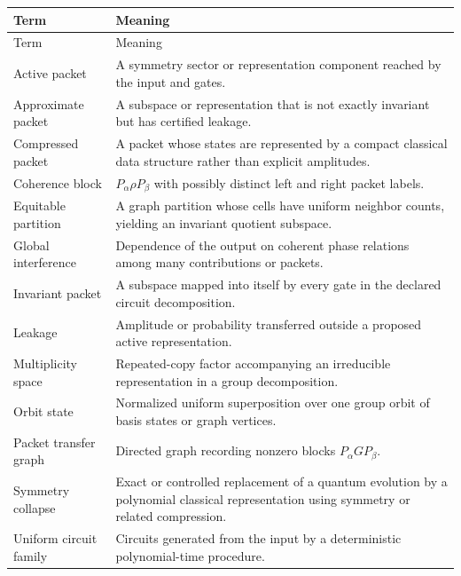 \begingroup\small

\begin{longtable}{@{}L{.25\textwidth}L{.66\textwidth}@{}}
\toprule
Term & Meaning\\
\midrule
\endfirsthead
\toprule
Term & Meaning\\
\midrule
\endhead
Active packet & A symmetry sector or representation component reached by the input and gates.\\
Approximate packet & A subspace or representation that is not exactly invariant but has certified leakage.\\
Compressed packet & A packet whose states are represented by a compact classical data structure rather than explicit amplitudes.\\
Coherence block & $P_\alpha\rho P_\beta$ with possibly distinct left and right packet labels.\\
Equitable partition & A graph partition whose cells have uniform neighbor counts, yielding an invariant quotient subspace.\\
Global interference & Dependence of the output on coherent phase relations among many contributions or packets.\\
Invariant packet & A subspace mapped into itself by every gate in the declared circuit decomposition.\\
Leakage & Amplitude or probability transferred outside a proposed active representation.\\
Multiplicity space & Repeated-copy factor accompanying an irreducible representation in a group decomposition.\\
Orbit state & Normalized uniform superposition over one group orbit of basis states or graph vertices.\\
Packet transfer graph & Directed graph recording nonzero blocks $P_\alpha G P_\beta$.\\
Symmetry collapse & Exact or controlled replacement of a quantum evolution by a polynomial classical representation using symmetry or related compression.\\
Uniform circuit family & Circuits generated from the input by a deterministic polynomial-time procedure.\\
\bottomrule
\end{longtable}
\endgroup